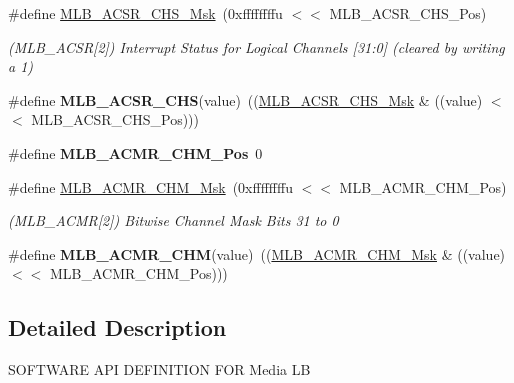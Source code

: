\begin{DoxyCompactItemize}
\#define \mbox{\hyperlink{group__SAMV71__MLB_ga27acfead22a0f6a44d1fd728dc429adc}{M\+L\+B\+\_\+\+A\+C\+S\+R\+\_\+\+C\+H\+S\+\_\+\+Msk}}~(0xffffffffu $<$$<$ M\+L\+B\+\_\+\+A\+C\+S\+R\+\_\+\+C\+H\+S\+\_\+\+Pos)
\begin{DoxyCompactList}\small\item\em (M\+L\+B\+\_\+\+A\+C\+SR\mbox{[}2\mbox{]}) Interrupt Status for Logical Channels \mbox{[}31\+:0\mbox{]} (cleared by writing a 1) \end{DoxyCompactList}\item 
\mbox{\label{group__SAMV71__MLB_gab3b11abf7c30ae4d734deb3fbcf74f25}} 
\#define {\bfseries M\+L\+B\+\_\+\+A\+C\+S\+R\+\_\+\+C\+HS}(value)~((\mbox{\hyperlink{group__SAMV71__MLB_ga27acfead22a0f6a44d1fd728dc429adc}{M\+L\+B\+\_\+\+A\+C\+S\+R\+\_\+\+C\+H\+S\+\_\+\+Msk}} \& ((value) $<$$<$ M\+L\+B\+\_\+\+A\+C\+S\+R\+\_\+\+C\+H\+S\+\_\+\+Pos)))
\item 
\mbox{\label{group__SAMV71__MLB_ga0d43996da742ca999691b46b2075854f}} 
\#define {\bfseries M\+L\+B\+\_\+\+A\+C\+M\+R\+\_\+\+C\+H\+M\+\_\+\+Pos}~0
\item 
\mbox{\label{group__SAMV71__MLB_ga5ad349d83d0a22cbc6bc75a9b4b785c1}} 
\#define \mbox{\hyperlink{group__SAMV71__MLB_ga5ad349d83d0a22cbc6bc75a9b4b785c1}{M\+L\+B\+\_\+\+A\+C\+M\+R\+\_\+\+C\+H\+M\+\_\+\+Msk}}~(0xffffffffu $<$$<$ M\+L\+B\+\_\+\+A\+C\+M\+R\+\_\+\+C\+H\+M\+\_\+\+Pos)
\begin{DoxyCompactList}\small\item\em (M\+L\+B\+\_\+\+A\+C\+MR\mbox{[}2\mbox{]}) Bitwise Channel Mask Bits 31 to 0 \end{DoxyCompactList}\item 
\mbox{\label{group__SAMV71__MLB_ga4a3f7b6248630056b0df24eb23b2c67e}} 
\#define {\bfseries M\+L\+B\+\_\+\+A\+C\+M\+R\+\_\+\+C\+HM}(value)~((\mbox{\hyperlink{group__SAMV71__MLB_ga5ad349d83d0a22cbc6bc75a9b4b785c1}{M\+L\+B\+\_\+\+A\+C\+M\+R\+\_\+\+C\+H\+M\+\_\+\+Msk}} \& ((value) $<$$<$ M\+L\+B\+\_\+\+A\+C\+M\+R\+\_\+\+C\+H\+M\+\_\+\+Pos)))
\end{DoxyCompactItemize}


\subsection{Detailed Description}
S\+O\+F\+T\+W\+A\+RE A\+PI D\+E\+F\+I\+N\+I\+T\+I\+ON F\+OR Media LB 
